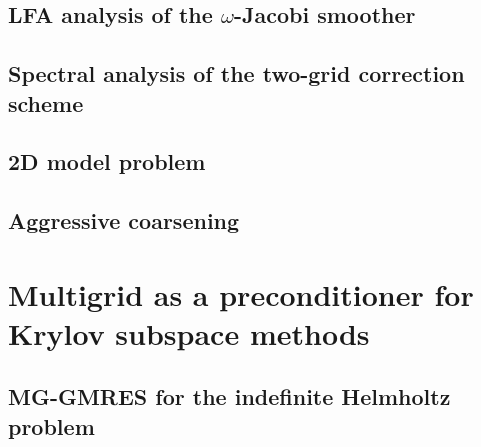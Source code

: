 \documentclass[a4paper,12pt]{article}
\begin{document}
\subsection{LFA analysis of the $\omega$-Jacobi smoother}

\subsection{Spectral analysis of the two-grid correction scheme}

\subsection{2D model problem}

\subsection{Aggressive coarsening}

\section{Multigrid as a preconditioner for Krylov subspace methods}

\subsection{MG-GMRES for the indefinite Helmholtz problem}
\end{document}
